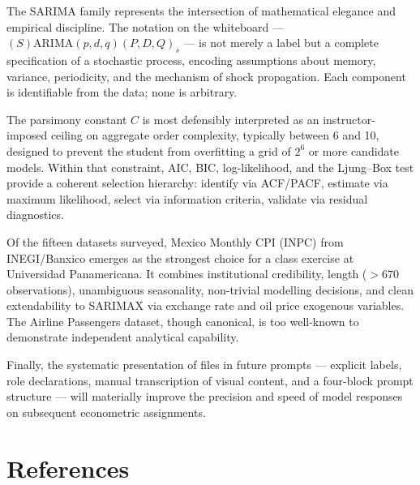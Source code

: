 \documentclass[12pt,a4paper]{article}
\begin{document}
The SARIMA family represents the intersection of mathematical elegance and
empirical discipline. The notation on the whiteboard — $(S)\text{ARIMA}(p,d,q)(P,D,Q)_s$
— is not merely a label but a complete specification of a stochastic process,
encoding assumptions about memory, variance, periodicity, and the mechanism of
shock propagation. Each component is identifiable from the data; none is
arbitrary.

The parsimony constant $C$ is most defensibly interpreted as an instructor-imposed
ceiling on aggregate order complexity, typically between 6 and 10, designed to
prevent the student from overfitting a grid of $2^6$ or more candidate models.
Within that constraint, AIC, BIC, log-likelihood, and the Ljung--Box test provide
a coherent selection hierarchy: identify via ACF/PACF, estimate via maximum
likelihood, select via information criteria, validate via residual diagnostics.

Of the fifteen datasets surveyed, Mexico Monthly CPI (INPC) from INEGI/Banxico
emerges as the strongest choice for a class exercise at Universidad Panamericana.
It combines institutional credibility, length ($>670$ observations), unambiguous
seasonality, non-trivial modelling decisions, and clean extendability to SARIMAX
via exchange rate and oil price exogenous variables. The Airline Passengers
dataset, though canonical, is too well-known to demonstrate independent analytical
capability.

Finally, the systematic presentation of files in future prompts — explicit
labels, role declarations, manual transcription of visual content, and a
four-block prompt structure — will materially improve the precision and speed of
model responses on subsequent econometric assignments.

\newpage
\section*{References}
\end{document}
